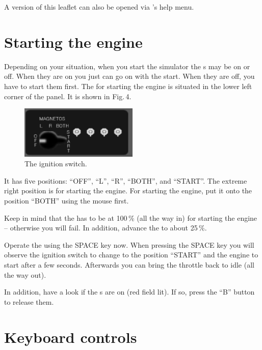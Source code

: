 \noindent
A version of this leaflet can also be opened via \FlightGear{}'s help menu.

\section{Starting the engine}

Depending on your situation, when you start the simulator the
s may be on or off. When they are on you just can go on
with the start. When they are off, you have to start them first. The
 for starting the engine is situated in the
lower left corner of the panel. It is shown in Fig.\,4.

\begin{figure}[!htp]
\centering
\includegraphics[width=0.5\textwidth]{magnet2}
\caption{The ignition switch.}
\end{figure}

It has five positions: ``OFF'', ``L'', ``R'', ``BOTH'', and ``START''. 
The extreme right position is for starting the engine. For starting the
engine, put it onto the position ``BOTH'' using the mouse first.

Keep in mind that the  has to be at 100\,\% (all
the way in) for starting the engine -- otherwise you will fail. In
addition, advance the  to about 25\,\%.

Operate the  using the SPACE key now. When pressing the
SPACE key you will observe the ignition switch to change to the
position ``START'' and the engine to start after a few seconds. 
Afterwards you can bring the throttle back to idle (all the way out).

In addition, have a look if the s are on (red
field lit). If so, press the ``B'' button to release them.

\section{Keyboard controls}

